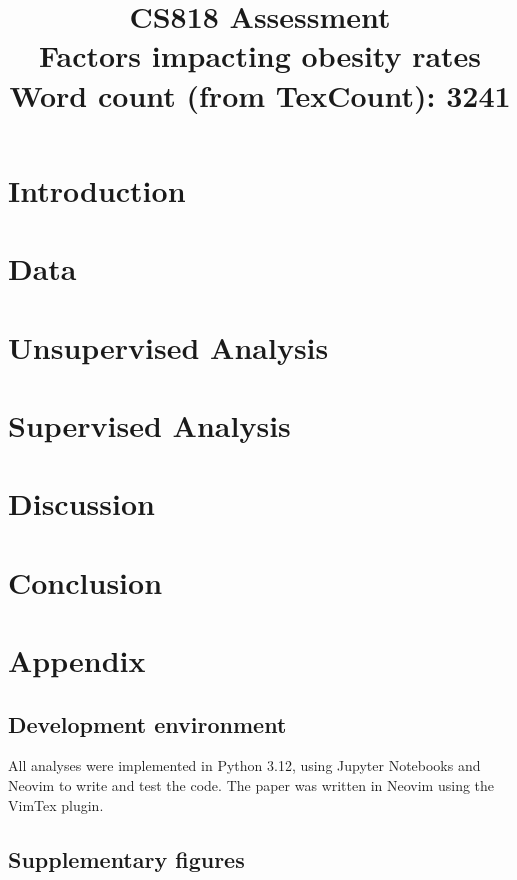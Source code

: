 \documentclass[a4paper,oneside,11pt]{book}
\title{CS818 Assessment\\Factors impacting obesity rates\\[1ex]
  \small Word count (from TexCount): 3241}
\begin{document}
\maketitle


\frontmatter

\tableofcontents

\listoffigures

\listoftables

\mainmatter

\chapter{Introduction}


\chapter{Data}


\chapter{Unsupervised Analysis}


\chapter{Supervised Analysis}


\chapter{Discussion}


\chapter{Conclusion}


\chapter{Appendix}
\section{Development environment}
All analyses were implemented in Python 3.12, using Jupyter Notebooks and Neovim to write and test the code. The paper was written in Neovim using the VimTex plugin.  
\section{Supplementary figures}


\printbibliography
\end{document}
